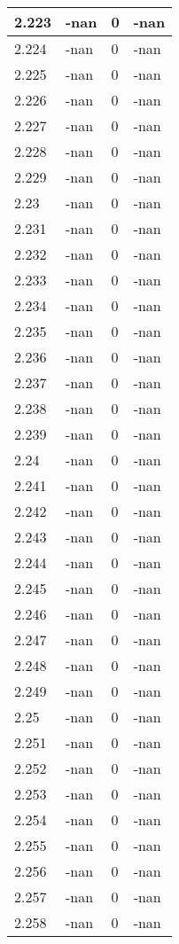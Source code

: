 \documentclass[a4paper,14pt]{extarticle}
\begin{document}
\begin{longtable}{||m{3cm}||m{3cm}|m{3cm}||m{3cm}||}
\hline
2.223 & -nan & 0 & -nan\\
\hline
2.224 & -nan & 0 & -nan\\
\hline
2.225 & -nan & 0 & -nan\\
\hline
2.226 & -nan & 0 & -nan\\
\hline
2.227 & -nan & 0 & -nan\\
\hline
2.228 & -nan & 0 & -nan\\
\hline
2.229 & -nan & 0 & -nan\\
\hline
2.23 & -nan & 0 & -nan\\
\hline
2.231 & -nan & 0 & -nan\\
\hline
2.232 & -nan & 0 & -nan\\
\hline
2.233 & -nan & 0 & -nan\\
\hline
2.234 & -nan & 0 & -nan\\
\hline
2.235 & -nan & 0 & -nan\\
\hline
2.236 & -nan & 0 & -nan\\
\hline
2.237 & -nan & 0 & -nan\\
\hline
2.238 & -nan & 0 & -nan\\
\hline
2.239 & -nan & 0 & -nan\\
\hline
2.24 & -nan & 0 & -nan\\
\hline
2.241 & -nan & 0 & -nan\\
\hline
2.242 & -nan & 0 & -nan\\
\hline
2.243 & -nan & 0 & -nan\\
\hline
2.244 & -nan & 0 & -nan\\
\hline
2.245 & -nan & 0 & -nan\\
\hline
2.246 & -nan & 0 & -nan\\
\hline
2.247 & -nan & 0 & -nan\\
\hline
2.248 & -nan & 0 & -nan\\
\hline
2.249 & -nan & 0 & -nan\\
\hline
2.25 & -nan & 0 & -nan\\
\hline
2.251 & -nan & 0 & -nan\\
\hline
2.252 & -nan & 0 & -nan\\
\hline
2.253 & -nan & 0 & -nan\\
\hline
2.254 & -nan & 0 & -nan\\
\hline
2.255 & -nan & 0 & -nan\\
\hline
2.256 & -nan & 0 & -nan\\
\hline
2.257 & -nan & 0 & -nan\\
\hline
2.258 & -nan & 0 & -nan\\

\end{longtable}
\end{document}
